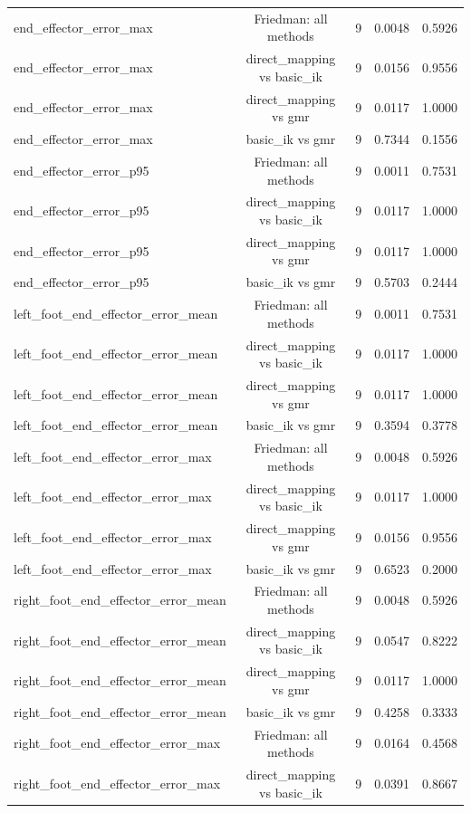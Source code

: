 \begin{table}[t]
{\begin{tabular}{lcccc}
end\_effector\_error\_max & Friedman: all methods & 9 & 0.0048 & 0.5926 \\
end\_effector\_error\_max & direct\_mapping vs basic\_ik & 9 & 0.0156 & 0.9556 \\
end\_effector\_error\_max & direct\_mapping vs gmr & 9 & 0.0117 & 1.0000 \\
end\_effector\_error\_max & basic\_ik vs gmr & 9 & 0.7344 & 0.1556 \\
end\_effector\_error\_p95 & Friedman: all methods & 9 & 0.0011 & 0.7531 \\
end\_effector\_error\_p95 & direct\_mapping vs basic\_ik & 9 & 0.0117 & 1.0000 \\
end\_effector\_error\_p95 & direct\_mapping vs gmr & 9 & 0.0117 & 1.0000 \\
end\_effector\_error\_p95 & basic\_ik vs gmr & 9 & 0.5703 & 0.2444 \\
left\_foot\_end\_effector\_error\_mean & Friedman: all methods & 9 & 0.0011 & 0.7531 \\
left\_foot\_end\_effector\_error\_mean & direct\_mapping vs basic\_ik & 9 & 0.0117 & 1.0000 \\
left\_foot\_end\_effector\_error\_mean & direct\_mapping vs gmr & 9 & 0.0117 & 1.0000 \\
left\_foot\_end\_effector\_error\_mean & basic\_ik vs gmr & 9 & 0.3594 & 0.3778 \\
left\_foot\_end\_effector\_error\_max & Friedman: all methods & 9 & 0.0048 & 0.5926 \\
left\_foot\_end\_effector\_error\_max & direct\_mapping vs basic\_ik & 9 & 0.0117 & 1.0000 \\
left\_foot\_end\_effector\_error\_max & direct\_mapping vs gmr & 9 & 0.0156 & 0.9556 \\
left\_foot\_end\_effector\_error\_max & basic\_ik vs gmr & 9 & 0.6523 & 0.2000 \\
right\_foot\_end\_effector\_error\_mean & Friedman: all methods & 9 & 0.0048 & 0.5926 \\
right\_foot\_end\_effector\_error\_mean & direct\_mapping vs basic\_ik & 9 & 0.0547 & 0.8222 \\
right\_foot\_end\_effector\_error\_mean & direct\_mapping vs gmr & 9 & 0.0117 & 1.0000 \\
right\_foot\_end\_effector\_error\_mean & basic\_ik vs gmr & 9 & 0.4258 & 0.3333 \\
right\_foot\_end\_effector\_error\_max & Friedman: all methods & 9 & 0.0164 & 0.4568 \\
right\_foot\_end\_effector\_error\_max & direct\_mapping vs basic\_ik & 9 & 0.0391 & 0.8667 \\

\end{tabular}}
\end{table}
